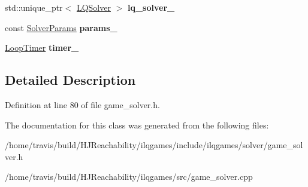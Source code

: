 \begin{DoxyCompactItemize}
\item 
std\+::unique\+\_\+ptr$<$ \hyperlink{classilqgames_1_1_l_q_solver}{L\+Q\+Solver} $>$ {\bfseries lq\+\_\+solver\+\_\+}\hypertarget{classilqgames_1_1_game_solver_a1b7e0da6a2566c0a959b7c6c9d7845be}{}\label{classilqgames_1_1_game_solver_a1b7e0da6a2566c0a959b7c6c9d7845be}

\item 
const \hyperlink{structilqgames_1_1_solver_params}{Solver\+Params} {\bfseries params\+\_\+}\hypertarget{classilqgames_1_1_game_solver_adb70fc48a6420c1b516becd5c108a92a}{}\label{classilqgames_1_1_game_solver_adb70fc48a6420c1b516becd5c108a92a}

\item 
\hyperlink{classilqgames_1_1_loop_timer}{Loop\+Timer} {\bfseries timer\+\_\+}\hypertarget{classilqgames_1_1_game_solver_ae77a0725fdd98ec49f96ebf33d966650}{}\label{classilqgames_1_1_game_solver_ae77a0725fdd98ec49f96ebf33d966650}

\end{DoxyCompactItemize}


\subsection{Detailed Description}


Definition at line 80 of file game\+\_\+solver.\+h.



The documentation for this class was generated from the following files\+:\begin{DoxyCompactItemize}
\item 
/home/travis/build/\+H\+J\+Reachability/ilqgames/include/ilqgames/solver/game\+\_\+solver.\+h\item 
/home/travis/build/\+H\+J\+Reachability/ilqgames/src/game\+\_\+solver.\+cpp\end{DoxyCompactItemize}
